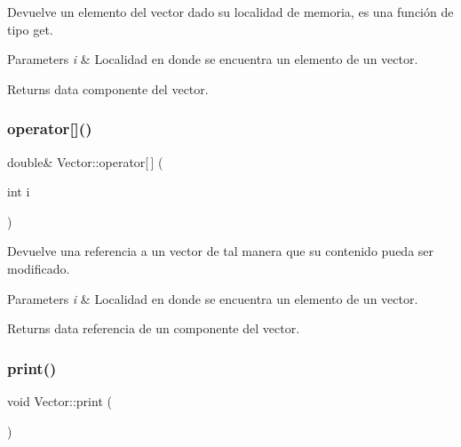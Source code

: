 Devuelve un elemento del vector dado su localidad de memoria, es una función de tipo get. 


\begin{DoxyParams}{Parameters}
{\em i} & Localidad en donde se encuentra un elemento de un vector. \\
\hline
\end{DoxyParams}
\begin{DoxyReturn}{Returns}
data componente del vector. 
\end{DoxyReturn}
\hypertarget{class_vector_a8cc4aefe1d880f18feac3426ea8d933e}{}\label{class_vector_a8cc4aefe1d880f18feac3426ea8d933e} 
\subsubsection{\texorpdfstring{operator[]()}{operator[]()}\hspace{0.1cm}{\footnotesize\ttfamily [2/2]}}
{\footnotesize\ttfamily double\& Vector\+::operator\mbox{[}$\,$\mbox{]} (\begin{DoxyParamCaption}\item[{int}]{i }\end{DoxyParamCaption})\hspace{0.3cm}{\ttfamily [inline]}}



Devuelve una referencia a un vector de tal manera que su contenido pueda ser modificado. 


\begin{DoxyParams}{Parameters}
{\em i} & Localidad en donde se encuentra un elemento de un vector. \\
\hline
\end{DoxyParams}
\begin{DoxyReturn}{Returns}
data referencia de un componente del vector. 
\end{DoxyReturn}
\hypertarget{class_vector_aca4bf268bf617179662f3e04f6926d07}{}\label{class_vector_aca4bf268bf617179662f3e04f6926d07} 
\subsubsection{\texorpdfstring{print()}{print()}}
{\footnotesize\ttfamily void Vector\+::print (\begin{DoxyParamCaption}{ }\end{DoxyParamCaption})}



